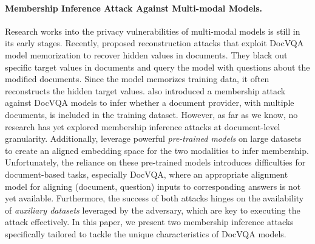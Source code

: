 \paragraph{Membership Inference Attack Against Multi-modal Models.} Research works into the privacy vulnerabilities of multi-modal models is still in its early stages. Recently, \citet{tito2024privacy,pinto24a} proposed reconstruction attacks that exploit DocVQA model memorization to recover hidden values in documents. They black out specific target values in documents and query the model with questions about the modified documents. Since the model memorizes training data, it often reconstructs the hidden target values. \citet{tito2024privacy} also introduced a membership attack against DocVQA models to infer whether a document provider, with multiple documents, is included in the training dataset. However, as far as we know, no research has yet explored membership inference attacks at document-level granularity. Additionally, \citet{ko2023practical,hu2022m} leverage powerful \textit{pre-trained models} on large datasets to create an aligned embedding space for the two modalities to infer membership. Unfortunately, the reliance on these pre-trained models introduces difficulties for document-based tasks, especially DocVQA, where an appropriate alignment model for aligning (document, question) inputs to corresponding answers is not yet available. Furthermore, the success of both attacks hinges on the availability of \textit{auxiliary datasets} leveraged by the adversary, which are key to executing the attack effectively. In this paper, we present two membership inference attacks specifically tailored to tackle the unique characteristics of DocVQA models.